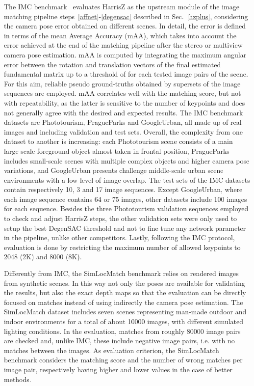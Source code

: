 \documentclass[times,twocolumn,final,authoryear]{elsarticle}
\begin{document}
The IMC benchmark~\citep{imw2020} evaluates HarrisZ as the upstream module of the image matching pipeline steps~\ref{affnet}-\ref{degensac} described in Sec.~\ref{hzplus}, considering the camera pose error obtained on different scenes. In detail, the error is defined in terms of the mean Average Accuracy (mAA), which takes into account the error achieved at the end of the matching pipeline after the stereo or multiview camera pose estimation. mAA is computed by integrating the maximum angular error between the rotation and translation vectors of the final estimated fundamental matrix up to a threshold of  for each tested image pairs of the scene. For this aim, reliable pseudo ground-truths obtained by supersets of the image sequences are employed. mAA correlates well with the matching score, but not with repeatability, as the latter is sensitive to the number of keypoints and does not generally agree with the desired and expected results. The IMC benchmark datasets are Phototourism, PragueParks and GoogleUrban, all made up of real images and including validation and test sets. Overall, the complexity from one dataset to another is increasing: each Phototourism scene consists of a main large-scale foreground object almost taken in frontal position, PragueParks includes small-scale scenes with multiple complex objects and higher camera pose variations, and GoogleUrban presents challenge middle-scale urban scene environments with a low level of image overlap. The test sets of the IMC datasets contain respectively 10, 3 and 17 image sequences. Except GoogleUrban, where each image sequence contains 64 or 75 images, other datasets include 100 images for each sequence. Besides the three Phototourism validation sequences employed to check and adjust HarrisZ steps, the other validation sets were only used to setup the best DegenSAC threshold and not to fine tune any network parameter in the pipeline, unlike other competitors. Lastly, following the IMC protocol, evaluation is done by restricting the maximum number of allowed keypoints to 2048 (2K) and 8000 (8K).

Differently from IMC, the SimLocMatch benchmark relies on rendered images from synthetic scenes. In this way not only the poses are available for validating the results, but also the exact depth maps so that the evaluation can be directly focused on matches instead of using indirectly the camera pose estimation. The SimLocMatch dataset includes seven scenes representing man-made outdoor and indoor environments for a total of about 10000 images, with different simulated lighting conditions. In the evaluation, matches from roughly 80000 image pairs are checked and, unlike IMC, these include negative image pairs, i.e. with no matches between the images. As evaluation criterion, the SimLocMatch benchmark considers the matching score and the number of wrong matches per image pair, respectively having higher and lower values in the case of better methods.
\end{document}
